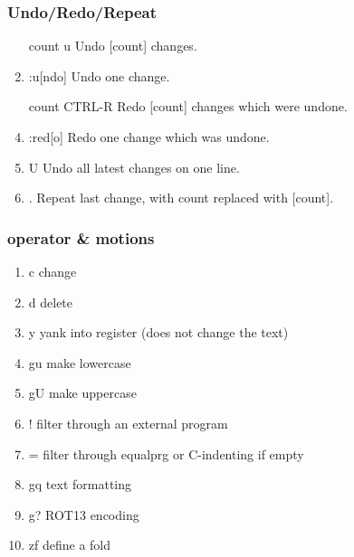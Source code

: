 \documentclass{beamer}
\begin{document}
\begin{frame}
  \frametitle{Undo/Redo/Repeat}

  \begin{enumerate}
    \item [count]u     Undo [count] changes.
    \item :u[ndo]   Undo one change.
    \item [count]CTRL-R    Redo [count] changes which were undone.
    \item :red[o]   Redo one change which was undone.
    \item U     Undo all latest changes on one line.
    \item .     Repeat last change, with count replaced with [count].
  \end{enumerate}
\end{frame}

\begin{frame}
  \frametitle{operator \& motions}
  \begin{enumerate}
    \item c change
    \item d delete
    \item y yank into register (does not change the text)
    \item gu make lowercase
    \item gU make uppercase
    \item ! filter through an external program
    \item = filter through equalprg or C-indenting if empty
    \item gq text formatting
    \item g? ROT13 encoding
    \item zf    define a fold
  \end{enumerate}
\end{frame}
\end{document}
